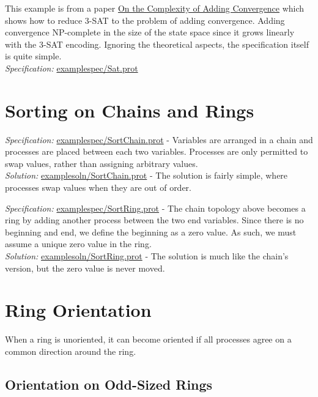 This example is from a paper \href{http://dx.doi.org/10.1007/978-3-642-40213-5_2}{On the Complexity of Adding Convergence} which shows how to reduce 3-SAT to the problem of adding convergence.
Adding convergence NP-complete in the size of the state space since it grows linearly with the 3-SAT encoding.
Ignoring the theoretical aspects, the specification itself is quite simple.
\\\textit{Specification:} \url{examplespec/Sat.prot}

\section{Sorting on Chains and Rings}

\textit{Specification:} \url{examplespec/SortChain.prot}
- Variables are arranged in a chain and processes are placed between each two variables.
Processes are only permitted to swap values, rather than assigning arbitrary values.
\\\textit{Solution:} \url{examplesoln/SortChain.prot}
- The solution is fairly simple, where processes swap values when they are out of order.

\textit{Specification:} \url{examplespec/SortRing.prot}
- The chain topology above becomes a ring by adding another process between the two end variables.
Since there is no beginning and end, we define the beginning as a zero value.
As such, we must assume a unique zero value in the ring.
\\\textit{Solution:} \url{examplesoln/SortRing.prot}
- The solution is much like the chain's version, but the zero value is never moved.

\section{Ring Orientation}

When a ring is unoriented, it can become oriented if all processes agree on a common direction around the ring.

\subsection{Orientation on Odd-Sized Rings}

